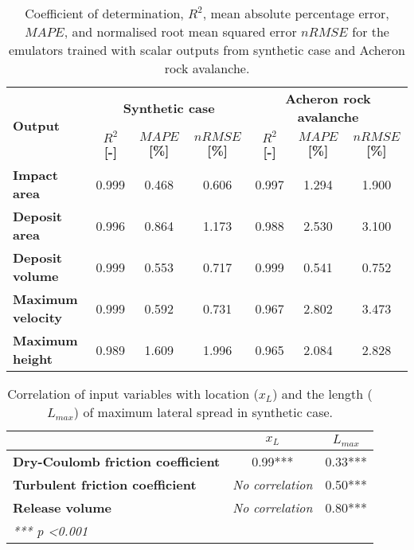 \documentclass[utf8]{FrontiersinHarvard}
\begin{document}
\begin{table}
\centering
\caption{Coefficient of determination, $R^2$, mean absolute percentage error, $MAPE$, and normalised root mean squared error $nRMSE$ for the emulators trained with scalar outputs from synthetic case and Acheron rock avalanche.}
\vspace{11pt}
\label{tab:scalar_emulator}
\begin{tabular}{@{}lcccccc@{}}
\toprule
\multirow{2}{*}{\textbf{Output}} &
  \multicolumn{3}{c}{\textbf{Synthetic case}} &
  \multicolumn{3}{c}{\textbf{Acheron rock avalanche}} \\
 &
  \textbf{$R^2$ {[}-{]}} &
  \textbf{$MAPE$ {[}\%{]}} &
  \textbf{$nRMSE$ {[}\%{]}} &
  \textbf{$R^2$ {[}-{]}} &
  \textbf{$MAPE$ {[}\%{]}} &
  \textbf{$nRMSE$ {[}\%{]}} \\ \midrule
\textbf{Impact area}      & 0.999 & 0.468 & 0.606 & 0.997 & 1.294 & 1.900 \\
\textbf{Deposit area}     & 0.996 & 0.864 & 1.173 & 0.988 & 2.530 & 3.100 \\
\textbf{Deposit volume}   & 0.999 & 0.553 & 0.717 & 0.999 & 0.541 & 0.752 \\
\textbf{Maximum velocity} & 0.999 & 0.592 & 0.731 & 0.967 & 2.802 & 3.473 \\
\textbf{Maximum height}   & 0.989 & 1.609 & 1.996 & 0.965 & 2.084 & 2.828 \\ \bottomrule
\end{tabular}
\end{table}

\clearpage
\begin{table}
\centering
\caption{Correlation of input variables with location ($x_L$) and the length ($L_{max}$) of maximum lateral spread in synthetic case.}
\label{tab:corr}
\begin{tabular}{@{}lcc@{}}
\toprule
                                          & \textbf{$x_L$}           & \textbf{$L_{max}$} \\ \midrule
\textbf{Dry-Coulomb friction coefficient} & 0.99***                 & 0.33***         \\
\textbf{Turbulent friction coefficient}   & \textit{No correlation} & 0.50***         \\
\textbf{Release volume}                   & \textit{No correlation} & 0.80***         \\ \midrule
\multicolumn{3}{l}{\textit{*** p \textless 0.001}}                                   
\end{tabular}
\end{table}
\end{document}
